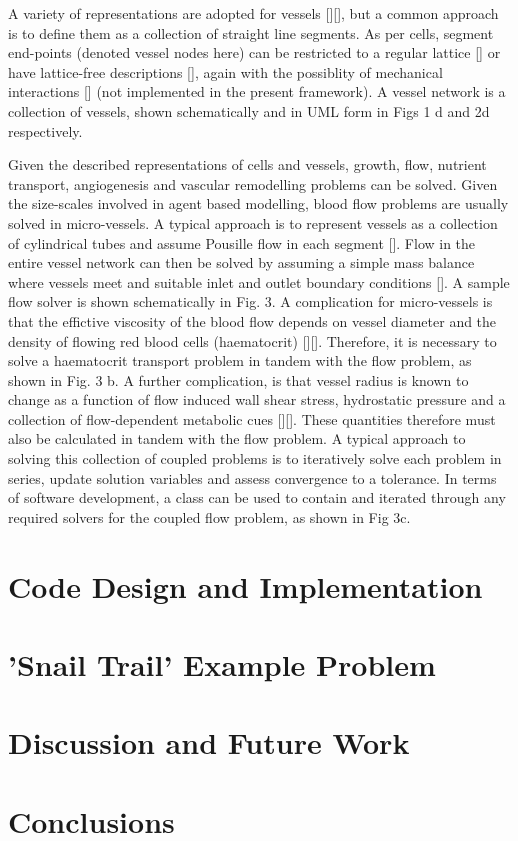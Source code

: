 \documentclass[superscriptaddress, a4paper]{article}
\begin{document}
A variety of representations are adopted for vessels [][], but a common approach is to define them as a collection of straight line segments. As per cells, segment end-points (denoted vessel nodes here) can be restricted to a regular lattice [] or have lattice-free descriptions [], again with the possiblity of mechanical interactions [] (not implemented in the present framework). A vessel network is a collection of vessels, shown schematically and in UML form in Figs 1 d and 2d respectively. 

Given the described representations of cells and vessels, growth, flow, nutrient transport, angiogenesis and vascular remodelling problems can be solved. Given the size-scales involved in agent based modelling, blood flow problems are usually solved in micro-vessels. A typical approach is to represent vessels as a collection of cylindrical tubes and assume Pousille flow in each segment []. Flow in the entire vessel network can then be solved by assuming a simple mass balance where vessels meet and suitable inlet and outlet boundary conditions []. A sample flow solver is shown schematically in Fig. 3. A complication for micro-vessels is that the effictive viscosity of the blood flow depends on vessel diameter and the density of flowing red blood cells (haematocrit) [][]. Therefore, it is necessary to solve a haematocrit transport problem in tandem with the flow problem, as shown in Fig. 3 b. A further complication, is that vessel radius is known to change as a function of flow induced wall shear stress, hydrostatic pressure and a collection of flow-dependent metabolic cues [][]. These quantities therefore must also be calculated in tandem with the flow problem. A typical approach to solving this collection of coupled problems is to iteratively solve each problem in series, update solution variables and assess convergence to a tolerance. In terms of software development, a class can be used to contain and iterated through any required solvers for the coupled flow problem, as shown in Fig 3c.










\section{Code Design and Implementation}
\label{sec:design and implementation}



\section{'Snail Trail' Example Problem}
\label{sec:results}


\section{Discussion and Future Work}
\label{sec:discussion and future work}

\section{Conclusions}
\label{sec:conclusions}
\end{document}
